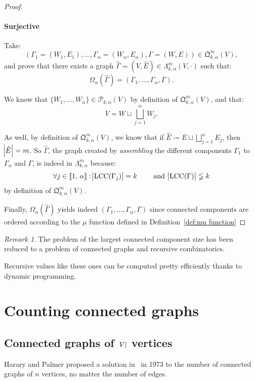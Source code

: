 \documentclass{article}
\theoremstyle{definition}
\theoremstyle{remark}
\newtheorem*{remark}{Remark}
\DeclareMathOperator{\LCC}{LCC}
\newcommand{\intint}[2]{\left\llbracket#1, \, #2\right\rrbracket}
\begin{document}
\begin{proof}
			\paragraph{Surjective} Take:
			\[\left(\Gamma_1 = (W_1, E_1), \ldots, \Gamma_\alpha = (W_\alpha, E_\alpha), \Gamma = (W, E)\right) \in \mathfrak Q_{k,\alpha}^m(V),\]
			and prove that there exists a graph $\hat \Gamma = (V, \hat E) \in \Lambda_{k,\alpha}^m(V, \cdot)$ such that:
			\[\Omega_\alpha(\hat \Gamma) = \left(\Gamma_1, \ldots, \Gamma_\alpha, \Gamma\right).\]

			We know that $\{W_1, \ldots, W_\alpha\} \in \mathcal P_{k,\alpha}(V)$ by definition of $\mathfrak Q_{k,\alpha}^m(V)$, and that:
			\[V = W \sqcup \bigsqcup_{j=1}^\alpha W_j.\]

			As well, by definition of $\mathfrak Q_{k,\alpha}^m(V)$, we know that if $\hat E \coloneqq E \sqcup \bigsqcup_{j=1}^\alpha E_j$, then $\abs {\hat E} = m$.
			So $\hat \Gamma$, the graph created by \textit{assembling} the different components $\Gamma_1$ to $\Gamma_\alpha$ and $\Gamma$, is indeed in
			$\Lambda_{k,\alpha}^m$ because:
			\[\forall j \in \intint 1\alpha : \abs {\LCC(\Gamma_j)} = k\qquad \text{ and } \abs {\LCC(\Gamma)} \lneqq k\]
			by definition of $\mathfrak Q_{k,\alpha}^m(V)$.

			Finally, $\Omega_\alpha(\hat \Gamma)$ yields indeed $(\Gamma_1, \ldots, \Gamma_\alpha, \Gamma)$ since connected components are ordered according
			to the $\mu$ function defined in Definition~\ref{def:mu function}
			\end{proof}

			\begin{remark} The problem of the largest connected component size has been reduced to a problem of connected graphs and recursive combinatorics.

			Recursive values like these ones can be computed pretty efficiently thanks to dynamic programming.
			\end{remark}

\section{Counting connected graphs}
	\subsection{Connected graphs of $\abs V$ vertices}
		Harary and Palmer proposed a solution in~\cite{Harary&Palmer1973} in 1973 to the number of connected graphs of $n$ vertices, no matter the number of edges.
\end{document}
